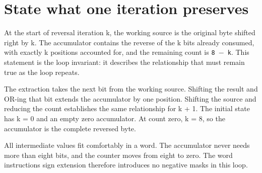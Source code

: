 \section{State what one iteration
  preserves}\label{003-eight-byte-sprite-p05-state-what-one-iteration-preserves}

At the start of reversal iteration k, the working source is the original
byte shifted right by k. The accumulator contains the reverse of the k
bits already consumed, with exactly k positions accounted for, and the
remaining count is \texttt{8\ \ensuremath{-}\ k}. This statement is the loop
invariant: it describes the relationship that must remain true as the
loop repeats.

The extraction takes the next bit from the working source. Shifting the
result and OR-ing that bit extends the accumulator by one position.
Shifting the source and reducing the count establishes the same
relationship for k + 1. The initial state has k = 0 and an empty zero
accumulator. At count zero, k = 8, so the accumulator is the complete
reversed byte.

All intermediate values fit comfortably in a word. The accumulator never
needs more than eight bits, and the counter moves from eight to zero.
The word instructions\textquotesingle{} sign extension therefore
introduces no negative masks in this loop.
